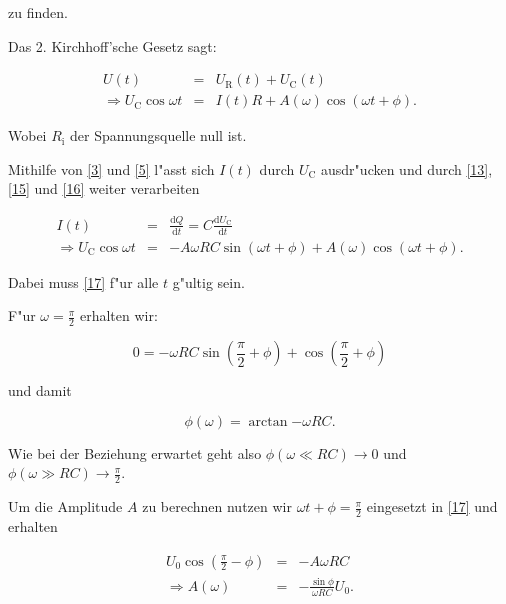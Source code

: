 \documentclass{scrartcl}
\begin{document}
			zu finden.

			Das 2. Kirchhoff'sche Gesetz sagt:

			\begin{eqnarray}
				U(t) &=& U_{\mathrm{R}}(t) + U_{\mathrm{C}}(t) \label{14} \\ 
				\Rightarrow U_{\mathrm{C}} \cos{\omega t} &=& I(t)R + A(\omega) \cos{\left( \omega t + \phi \right) } \label{15}.
			\end{eqnarray}

			Wobei $R_{\mathrm{i}}$ der Spannungsquelle null ist.

			Mithilfe von \ref{3} und \ref{5} l"asst sich $I(t)$ durch $U_{\mathrm{C}}$ ausdr"ucken und durch \ref{13}, \ref{15} und \ref{16} weiter verarbeiten

			\begin{eqnarray}
				I(t) &=& \frac{\mathrm{d}Q}{\mathrm{d}t} = C \frac{\mathrm{d}U_{\mathrm{C}}}{\mathrm{d}t} \label{16}\\ 
				\Rightarrow U_{\mathrm{C}} \cos{\omega t} &=& -A\omega RC \sin{\left( \omega t + \phi \right)} + A(\omega)\cos{\left( \omega t + \phi \right)} \label{17}.
			\end{eqnarray}

			Dabei muss \ref{17} f"ur alle $t$ g"ultig sein.

			F"ur $\omega = \frac{\pi}{2}$ erhalten wir:

			\begin{equation}
				0 = -\omega RC \sin{\left( \frac{\pi}{2} + \phi \right) } + \cos{\left( \frac{\pi}{2} + \phi \right) } \label{18}
			\end{equation}

			und damit

			\begin{equation}
				\phi(\omega) = \arctan{-\omega RC} \label{19}.
			\end{equation}

			\newpage

			Wie bei der Beziehung erwartet geht also $\phi(\omega \ll RC) \rightarrow 0$ und $\phi(\omega \gg RC) \rightarrow \frac{\pi}{2}$.

			Um die Amplitude $A$ zu berechnen nutzen wir $\omega t + \phi = \frac{\pi}{2}$ eingesetzt in \ref{17} und erhalten

			\begin{eqnarray}
				U_{\mathrm{0}} \cos{\left( \frac{\pi}{2} - \phi \right)} &=& -A \omega RC \label{20}\\
				\Rightarrow A(\omega) &=& -\frac{\sin{\phi}}{\omega RC}U_{\mathrm{0}} \label{21}.
			\end{eqnarray}
\end{document}
